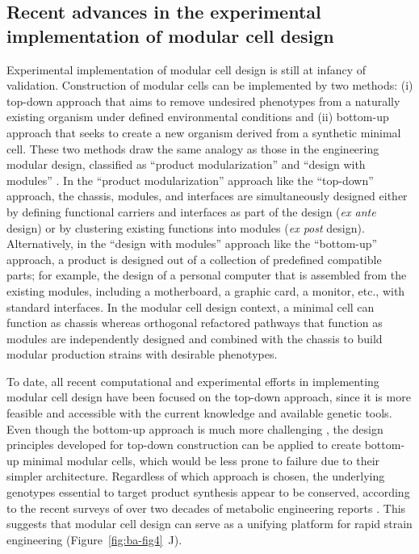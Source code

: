 \subsection{Recent advances in the experimental implementation of modular cell design}

Experimental implementation of modular cell design is still at infancy of validation.
Construction of modular cells can be implemented by two methods: (i) top-down approach that aims to remove undesired phenotypes from a naturally existing organism under defined environmental conditions \citep{trinh2008, trinh2006} and (ii) bottom-up approach that seeks to create a new organism derived from a synthetic minimal cell.
\citep{hutchison2016} These two methods draw the same analogy as those in the engineering modular design, classified as ``product modularization'' and ``design with modules'' \citep{bonvoisin2016}.
In the ``product modularization'' approach like the ``top-down'' approach, the chassis, modules, and interfaces are simultaneously designed either by defining functional carriers and interfaces as part of the design (\emph{ex ante} design) or by clustering existing functions into modules (\emph{ex post} design).
Alternatively, in the ``design with modules'' approach like the ``bottom-up'' approach, a product is designed out of a collection of predefined compatible parts; for example, the design of a personal computer that is assembled from the existing modules, including a motherboard, a graphic card, a monitor, etc., with standard interfaces.
In the modular cell design context, a minimal cell can function as chassis whereas orthogonal refactored pathways that function as modules are independently designed and combined with the chassis to build modular production strains with desirable phenotypes.

To date, all recent computational \citep{garcia2019, trinh2015} and experimental \citep{layton2014, wilbanks2017} efforts in implementing modular cell design have been focused on the top-down approach, since it is more feasible and accessible with the current knowledge and available genetic tools.
Even though the bottom-up approach is much more challenging \citep{hutchison2016}, the design principles developed for top-down construction can be applied to create bottom-up minimal modular cells, which would be less prone to failure due to their simpler architecture.
Regardless of which approach is chosen, the underlying genotypes essential to target product synthesis appear to be conserved, according to the recent surveys of over two decades of metabolic engineering reports \citep{king2017, winkler2015}.
This suggests that modular cell design can serve as a unifying platform for rapid strain engineering (Figure~\ref{fig:ba-fig4}~J).

